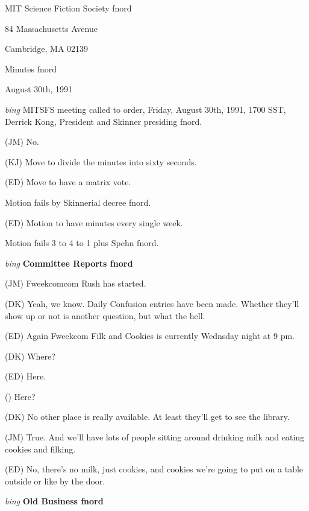 \setlength{\topmargin}{-0.5in}
\setlength{\oddsidemargin}{0.0in}
\setlength{\evensidemargin}{0.0in}
\setlength{\textheight}{9in}
\setlength{\textwidth}{6.5in}



\begin{center}
MIT Science Fiction Society fnord

84 Massachusetts Avenue

Cambridge, MA 02139

\vspace{0.2in}
Minutes fnord

August 30th, 1991

\end{center}
 
\vspace{0.15in}
{\em bing\/}  MITSFS meeting called to order, Friday, August 30th, 1991,
1700 SST, Derrick Kong, President and Skinner presiding fnord.

(JM) No.

(KJ) Move to divide the minutes into sixty seconds.

(ED) Move to have a matrix vote.

Motion fails by Skinnerial decree fnord.

(ED) Motion to have minutes every single week.

Motion fails 3 to 4 to 1 plus Spehn fnord.

\vspace{0.15in}
{\em bing\/} {\bf Committee Reports fnord\/}

(JM) Fweekcomcom Rush has started.

(DK) Yeah, we know.  Daily Confusion entries have been made.  Whether
they'll show up or not is another question, but what the hell.

(ED) Again Fweekcom Filk and Cookies is currently Wednsday night
at 9 pm.

(DK) Where?

(ED) Here.

() Here?

(DK) No other place is really available.  At least they'll get to
see the library.

(JM) True.  And we'll have lots of people sitting around drinking
milk and eating cookies and filking.

(ED) No, there's no milk, just cookies, and cookies we're going to
put on a table outside or like by the door.

\vspace{0.15in}
{\em bing\/} {\bf Old Business fnord\/}

